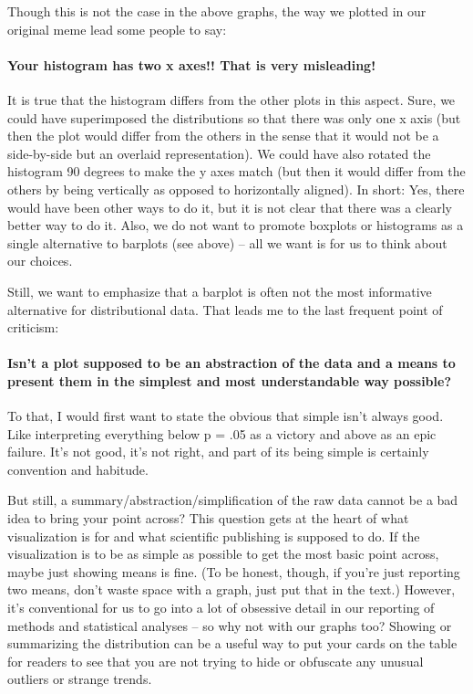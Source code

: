 \documentclass[english,floatsintext,man]{apa6}
\begin{document}
Though this is not the case in the above graphs, the way we plotted in
our original meme lead some people to say:

\paragraph{Your histogram has two x axes!! That is very
misleading!}\label{your-histogram-has-two-x-axes-that-is-very-misleading}

It is true that the histogram differs from the other plots in this
aspect. Sure, we could have superimposed the distributions so that there
was only one x axis (but then the plot would differ from the others in
the sense that it would not be a side-by-side but an overlaid
representation). We could have also rotated the histogram 90 degrees to
make the y axes match (but then it would differ from the others by being
vertically as opposed to horizontally aligned). In short: Yes, there
would have been other ways to do it, but it is not clear that there was
a clearly better way to do it. Also, we do not want to promote boxplots
or histograms as a single alternative to barplots (see above) -- all we
want is for us to think about our choices.

Still, we want to emphasize that a barplot is often not the most
informative alternative for distributional data. That leads me to the
last frequent point of criticism:

\paragraph{Isn't a plot supposed to be an abstraction of the data and a
means to present them in the simplest and most understandable way
possible?}\label{isnt-a-plot-supposed-to-be-an-abstraction-of-the-data-and-a-means-to-present-them-in-the-simplest-and-most-understandable-way-possible}

To that, I would first want to state the obvious that simple isn't
always good. Like interpreting everything below p = .05 as a victory and
above as an epic failure. It's not good, it's not right, and part of its
being simple is certainly convention and habitude.

But still, a summary/abstraction/simplification of the raw data cannot
be a bad idea to bring your point across? This question gets at the
heart of what visualization is for and what scientific publishing is
supposed to do. If the visualization is to be as simple as possible to
get the most basic point across, maybe just showing means is fine. (To
be honest, though, if you're just reporting two means, don't waste space
with a graph, just put that in the text.) However, it's conventional for
us to go into a lot of obsessive detail in our reporting of methods and
statistical analyses -- so why not with our graphs too? Showing or
summarizing the distribution can be a useful way to put your cards on
the table for readers to see that you are not trying to hide or
obfuscate any unusual outliers or strange trends.
\end{document}
